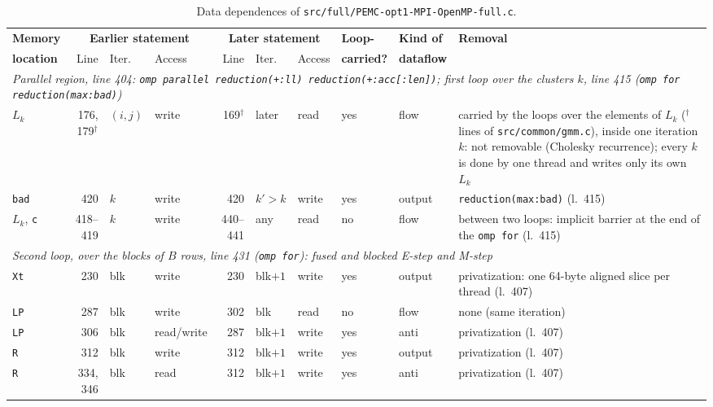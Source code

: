 \documentclass[conference,onecolumn]{IEEEtran}
\begin{document}
\begin{table}[H]
\centering
\caption{Data dependences of \texttt{src/full/PEMC-opt1-MPI-OpenMP-full.c}.}\label{tab:dep-opt1-full}
\scriptsize
\setlength{\tabcolsep}{3pt}
\begin{tabular}{lrllrllllp{}}
\toprule
\textbf{Memory} & \multicolumn{3}{c}{\textbf{Earlier statement}} & \multicolumn{3}{c}{\textbf{Later statement}} & \textbf{Loop-} & \textbf{Kind of} & \textbf{Removal} \\
\cmidrule(lr){2-4} \cmidrule(lr){5-7}
\textbf{location} & Line & Iter. & Access & Line & Iter. & Access & \textbf{carried?} & \textbf{dataflow} & \\
\midrule
\multicolumn{10}{p{0.92\textwidth}}{\emph{Parallel region, line 404: \texttt{omp parallel reduction(+:ll) reduction(+:acc[:len])}; first loop over the clusters $k$, line 415 (\texttt{omp for reduction(max:bad)})}} \\
$L_k$ & 176, 179$^\dagger$ & $(i,j)$ & write & 169$^\dagger$ & later & read & yes & flow & carried by the loops over the elements of $L_k$ ($^\dagger$lines of \texttt{src/common/gmm.c}), inside one iteration $k$: not removable (Cholesky recurrence); every $k$ is done by one thread and writes only its own $L_k$ \\
\texttt{bad} & 420 & $k$ & write & 420 & $k'>k$ & write & yes & output & \texttt{reduction(max:bad)} (l.~415) \\
$L_k$, \texttt{c} & 418--419 & $k$ & write & 440--441 & any & read & no & flow & between two loops: implicit barrier at the end of the \texttt{omp for} (l.~415) \\
\midrule
\multicolumn{10}{p{0.92\textwidth}}{\emph{Second loop, over the blocks of $B$ rows, line 431 (\texttt{omp for}): fused and blocked E-step and M-step}} \\
\texttt{Xt} & 230 & blk & write & 230 & blk$+1$ & write & yes & output & privatization: one 64-byte aligned slice per thread (l.~407) \\
\texttt{LP} & 287 & blk & write & 302 & blk & read & no & flow & none (same iteration) \\
\texttt{LP} & 306 & blk & read/write & 287 & blk$+1$ & write & yes & anti & privatization (l.~407) \\
\texttt{R} & 312 & blk & write & 312 & blk$+1$ & write & yes & output & privatization (l.~407) \\
\texttt{R} & 334, 346 & blk & read & 312 & blk$+1$ & write & yes & anti & privatization (l.~407) \\

\end{tabular}
\end{table}
\end{document}
